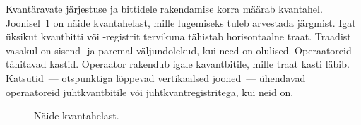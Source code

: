 \documentclass[12pt]{report}
\def\ket#1{\left|#1\right>}
\def\SWAP{\mathop{\rm SWAP}\nolimits}
\begin{document}
\begin{table}[]
    \caption{Töös kasutatud operaatorid, nende definitsioonid maatriksina ja tähistused ahelas.}
    \label{tab:gates}
\end{table}

Kvantäravate järjestuse ja bittidele rakendamise korra määrab kvantahel.
Joonisel~\ref{fig:circuits} on näide kvantahelast, mille lugemiseks tuleb arvestada järgmist.
Igat üksikut kvantbitti või -registrit tervikuna tähistab horisontaalne traat.
Traadist vasakul on sisend- ja paremal väljundolekud, kui need on olulised.
Operaatoreid tähitavad kastid.
Operaator rakendub igale kavantbitile, mille traat kasti läbib.
Katsutid~--- otspunktiga lõppevad vertikaalsed jooned~--- ühendavad operaatoreid juhtkvantbitile või juhtkvantregistritega, kui neid on.

\begin{figure}
    \centering
    \ifdefined\yquanton
    \fi
    \caption{Näide kvantahelast.}
    \label{fig:circuits}
\end{figure}
\end{document}

